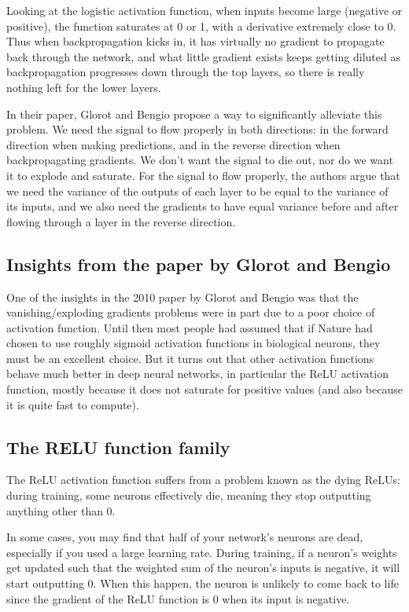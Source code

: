 \documentclass[%
oneside,                 %
final,                   %
10pt]{article}
\begin{document}
Looking at the logistic activation function, when inputs become large
(negative or positive), the function saturates at 0 or 1, with a
derivative extremely close to 0. Thus when backpropagation kicks in,
it has virtually no gradient to propagate back through the network,
and what little gradient exists keeps getting diluted as
backpropagation progresses down through the top layers, so there is
really nothing left for the lower layers.

In their paper, Glorot and Bengio propose a way to significantly
alleviate this problem. We need the signal to flow properly in both
directions: in the forward direction when making predictions, and in
the reverse direction when backpropagating gradients. We don’t want
the signal to die out, nor do we want it to explode and saturate. For
the signal to flow properly, the authors argue that we need the
variance of the outputs of each layer to be equal to the variance of
its inputs, and we also need the gradients to have equal variance
before and after flowing through a layer in the reverse direction.

\subsection{Insights from the paper by Glorot and Bengio}

One of the insights in the 2010 paper by Glorot and Bengio was that
the vanishing/exploding gradients problems were in part due to a poor
choice of activation function. Until then most people had assumed that
if Nature had chosen to use roughly sigmoid activation functions in
biological neurons, they must be an excellent choice. But it turns out
that other activation functions behave much better in deep neural
networks, in particular the ReLU activation function, mostly because
it does not saturate for positive values (and also because it is quite
fast to compute).

\subsection{The RELU function family}

The ReLU activation function suffers from a problem known as the dying
ReLUs: during training, some neurons effectively die, meaning they
stop outputting anything other than 0.

In some cases, you may find that half of your network’s neurons are
dead, especially if you used a large learning rate. During training,
if a neuron’s weights get updated such that the weighted sum of the
neuron’s inputs is negative, it will start outputting 0. When this
happen, the neuron is unlikely to come back to life since the gradient
of the ReLU function is 0 when its input is negative.
\end{document}
